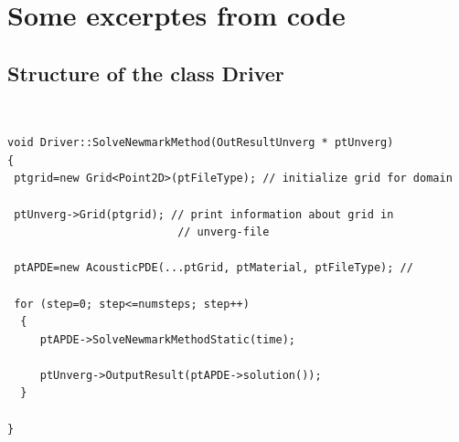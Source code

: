 \newslide
\section{ Some excerptes from code }
\subsection{ Structure of the class Driver }
\hrulefill \\
\begin{small}
\begin{verbatim}
void Driver::SolveNewmarkMethod(OutResultUnverg * ptUnverg)
{ 
 ptgrid=new Grid<Point2D>(ptFileType); // initialize grid for domain 

 ptUnverg->Grid(ptgrid); // print information about grid in
                          // unverg-file 

 ptAPDE=new AcousticPDE(...ptGrid, ptMaterial, ptFileType); // 

 for (step=0; step<=numsteps; step++)
  {
     ptAPDE->SolveNewmarkMethodStatic(time);

     ptUnverg->OutputResult(ptAPDE->solution());
  }
  
}
\end{verbatim}
\end{small}
\hrulefill
\newpage
\newslide
